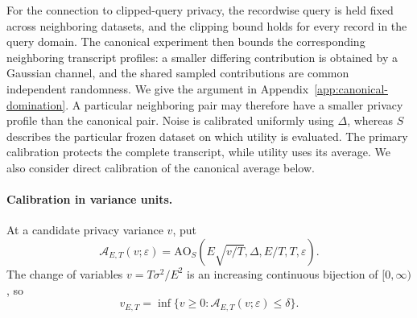 \documentclass[11pt]{article}
\theoremstyle{remark}
\newcommand{\AO}{\mathrm{AO}}
\begin{document}
For the connection to clipped-query privacy, the recordwise query is held
fixed across neighboring datasets, and the clipping bound holds for every
record in the query domain. The canonical experiment then bounds the
corresponding neighboring transcript profiles: a smaller differing
contribution is obtained by a Gaussian channel, and the shared sampled
contributions are common independent randomness. We give the argument in
Appendix~\ref{app:canonical-domination}. A particular neighboring pair may
therefore have a smaller privacy profile than the canonical pair. Noise is
calibrated uniformly using $\Delta$, whereas $S$ describes the particular
frozen dataset on which utility is evaluated. The primary calibration protects
the complete transcript, while utility uses its average. We also consider
direct calibration of the canonical average below.

\paragraph{Calibration in variance units.}
At a candidate privacy variance $v$, put
\begin{equation}\label{eq:runvariance-accountant}
 \mathcal A_{E,T}(v;\varepsilon)
 =\AO_S\!\left(E\sqrt{v/T},\Delta,E/T,T,\varepsilon\right).
\end{equation}
The change of variables $v=T\sigma^2/E^2$ is an increasing continuous
bijection of $[0,\infty)$, so
\[
v_{E,T}=\inf\{v\geq0:\mathcal A_{E,T}(v;\varepsilon)\leq\delta\}.
\]
\end{document}
